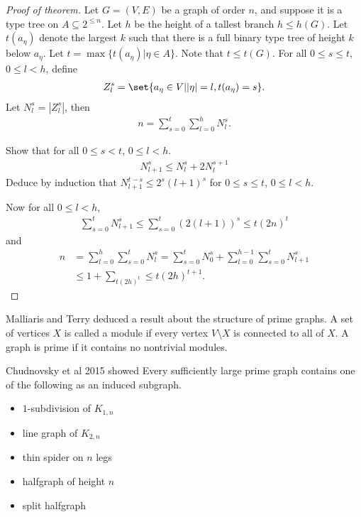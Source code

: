 \documentclass{article}
\begin{document}
\begin{proof}[Proof of theorem]
  Let $G=(V,E)$ be a graph of order $n$, and suppose it is a type tree on $A \subseteq 2^{\leq n}$.
  Let $h$ be the height of a tallest branch $h \leq h(G)$.
  Let $t(a_\eta)$ denote the largest $k$ such that there is a full binary type tree of height $k$ below $a_\eta$.
  Let $t = \max\{t(a_\eta) | \eta \in A\}$. Note that $t \leq t(G)$.
  For all $0 \leq s \leq t$, $0 \leq l < h$, define
  \begin{align*}
    Z_l^s = \set{a_\eta \in V | |\eta| = l, t(a_\eta) = s}.
  \end{align*}
  Let $N_l^s = |Z_l^s|$, then
  \begin{align*}
    n = \sum_{s=0}^t \sum_{l=0}^h N_l^s.
  \end{align*}
  \begin{ex}
    Show that for all $0 \leq s < t$, $0 \leq l < h$.
    \begin{align*}
      N_{l+1}^s \leq N_l^s + 2N_l^{s+1}
    \end{align*}
    Deduce by induction that $N_{l+1}^{t-s} \leq 2^s (l+1)^s$ for $0 \leq s \leq t$, $0 \leq l < h$.
  \end{ex}

  Now for all $0 \leq l < h$,
  \begin{align*}
    \sum_{s=0}^t N_{l+1}^s \leq \sum_{s=0}^t (2(l+1))^s \leq t(2n)^t
  \end{align*}
  and
  \begin{align*}
    n &= \sum_{l=0}^h \sum_{s=0}^t N_l^s = \sum_{s=0}^t N_0^s  + \sum_{l=0}^{h-1} \sum_{s=0}^t N_{l+1}^s \\
      &\leq 1 + \sum_{t (2h)^t} \leq t(2h)^{t+1}.
  \end{align*}
\end{proof}
Malliaris and Terry deduced a result about the structure of prime graphs.
A set of vertices $X$ is called a module if every vertex $V \setminus X$ is connected to all of $X$.
A graph is prime if it contains no nontrivial modules.

Chudnovsky et al 2015 showed
Every sufficiently large prime graph contains one of the following as an induced subgraph.
\begin{itemize}
  \item $1$-subdivision of $K_{1,n}$
  \item line graph of $K_{2,n}$
  \item thin spider on $n$ legs
  \item halfgraph of height $n$
  \item split halfgraph
\end{itemize}
\end{document}
